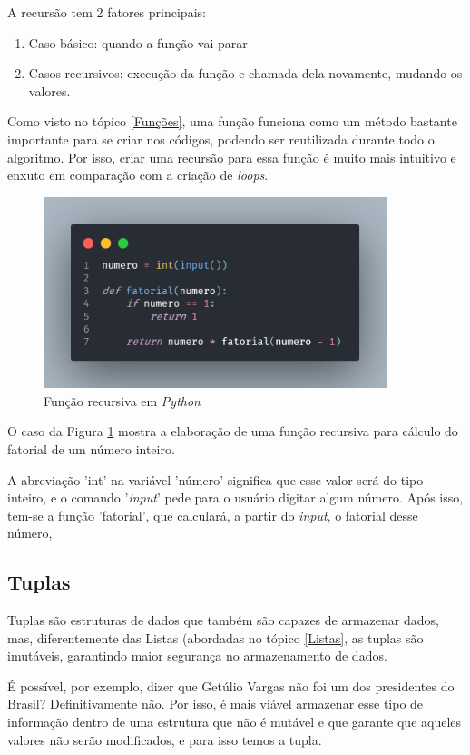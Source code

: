 \documentclass[a4paper, 12pt]{article} %
\begin{document}
A recursão tem 2 fatores principais:
\begin{enumerate}
    \item Caso básico: quando a função vai parar
    \item Casos recursivos: execução da função e chamada dela novamente, mudando os valores.
\end{enumerate}

Como visto no tópico \ref{Funções}, uma função funciona como um método bastante importante para se criar nos códigos, podendo ser reutilizada durante todo o algoritmo. Por isso, criar uma recursão para essa função é muito mais intuitivo e enxuto em comparação com a criação de \textit{loops}.

\begin{figure}[ht]
    \centering
    \includegraphics[width = 10cm]{imagens/recursao.png}
    \caption{Função recursiva em \textit{Python}}
    \label{recursao}
\end{figure}

\pagebreak
O caso da Figura \ref{recursao} mostra a elaboração de uma função recursiva para cálculo do fatorial de um número inteiro.

A abreviação 'int' na variável 'número' significa que esse valor será do tipo inteiro, e o comando '\textit{input}' pede para o usuário digitar algum número. Após isso, tem-se a função 'fatorial', que calculará, a partir do \textit{input}, o fatorial desse número,

\subsection{Tuplas}
Tuplas são estruturas de dados que também são capazes de armazenar dados, mas, diferentemente das Listas (abordadas no tópico \ref{Listas}, as tuplas são imutáveis, garantindo maior segurança no armazenamento de dados.

É possível, por exemplo, dizer que Getúlio Vargas não foi um dos presidentes do Brasil? Definitivamente não. Por isso, é mais viável armazenar esse tipo de informação dentro de uma estrutura que não é mutável e que garante que aqueles valores não serão modificados, e para isso temos a tupla.
\end{document}
